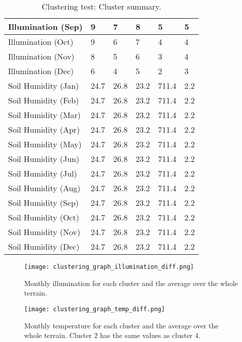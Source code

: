 \begin{table}[]
\begin{tabular}{|p{5cm}|p{2cm}|p{2cm}|p{2cm}|p{2cm}|p{2cm}|}
		\hline
		Illumination (Sep) & 9 & 7 & 8 & 5 & 5 \\
		\hline
		Illumination (Oct) & 9 & 6 & 7 & 4 & 4 \\
		\hline
		Illumination (Nov) & 8 & 5 & 6 & 3 & 4 \\
		\hline
		Illumination (Dec) & 6 & 4 & 5 & 2 & 3 \\
		\hline
  	    Soil Humidity (Jan) & 24.7 & 26.8 & 23.2 & 711.4 & 2.2 \\
		\hline
  	    Soil Humidity (Feb) & 24.7 & 26.8 & 23.2 & 711.4 & 2.2 \\
		\hline
  	    Soil Humidity (Mar) & 24.7 & 26.8 & 23.2 & 711.4 & 2.2 \\
		\hline
  	    Soil Humidity (Apr) & 24.7 & 26.8 & 23.2 & 711.4 & 2.2 \\
		\hline
  	    Soil Humidity (May) & 24.7 & 26.8 & 23.2 & 711.4 & 2.2 \\
		\hline
  	    Soil Humidity (Jun) & 24.7 & 26.8 & 23.2 & 711.4 & 2.2 \\
		\hline
  	    Soil Humidity (Jul) & 24.7 & 26.8 & 23.2 & 711.4 & 2.2 \\
		\hline
  	    Soil Humidity (Aug) & 24.7 & 26.8 & 23.2 & 711.4 & 2.2 \\
		\hline
  	    Soil Humidity (Sep) & 24.7 & 26.8 & 23.2 & 711.4 & 2.2 \\
		\hline
  	    Soil Humidity (Oct) & 24.7 & 26.8 & 23.2 & 711.4 & 2.2 \\
		\hline
  	    Soil Humidity (Nov) & 24.7 & 26.8 & 23.2 & 711.4 & 2.2 \\
		\hline
  	    Soil Humidity (Dec) & 24.7 & 26.8 & 23.2 & 711.4 & 2.2 \\
		\hline
		\end{tabular}
		\caption{Clustering test: Cluster summary.}
	  \label{tab:clustering_test_resulting_clusters}
\end{table}

\begin{figure}
\center
	\texttt{[image: clustering\_graph\_illumination\_diff.png]}
	\caption{ Monthly illumination for each cluster and the average over the whole terrain.}	
	\label{fig:clustering_graph_illumination}
\end{figure}

\begin{figure}
\center
	\texttt{[image: clustering\_graph\_temp\_diff.png]}
	\caption{ Monthly temperature for each cluster and the average over the whole terrain. Cluster 2 has the same values as cluster 4.}	
	\label{fig:clustering_graph_temp}
\end{figure}

